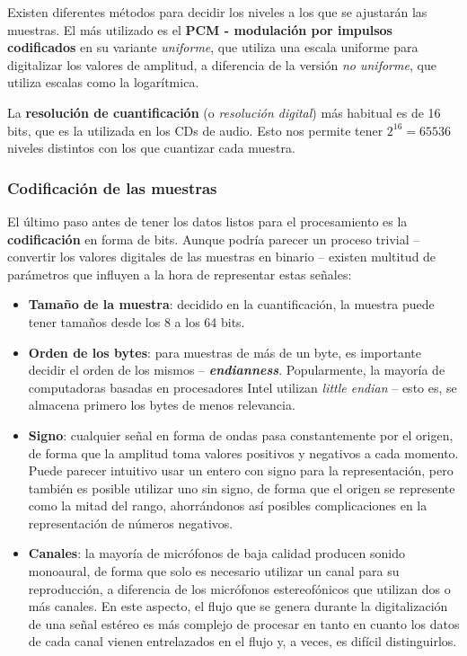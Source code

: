 Existen diferentes métodos para decidir los niveles a los que se ajustarán las
muestras. El más utilizado es el \textbf{PCM - modulación por impulsos
  codificados} en su variante \textit{uniforme}, que utiliza una escala uniforme
para digitalizar los valores de amplitud, a diferencia de la versión \textit{no
  uniforme}, que utiliza escalas como la logarítmica.

La \textbf{resolución de cuantificación} (o \textit{resolución digital}) más
habitual es de 16 bits, que es la utilizada en los CDs de audio. Esto nos
permite tener $2^{16} = 65536$ niveles distintos con los que cuantizar cada
muestra.

\subsubsection{Codificación de las muestras}

El último paso antes de tener los datos listos para el procesamiento es la
\textbf{codificación} en forma de bits. Aunque podría parecer un proceso trivial
-- convertir los valores digitales de las muestras en binario -- existen
multitud de parámetros que influyen a la hora de representar estas señales:
\begin{itemize}
\item \textbf{Tamaño de la muestra}: decidido en la cuantificación, la muestra
  puede tener tamaños desde los 8 a los 64 bits.
\item \textbf{Orden de los bytes}: para muestras de más de un byte, es
  importante decidir el orden de los mismos --
  \textbf{\textit{endianness}}. Popularmente, la mayoría de computadoras basadas
  en procesadores Intel utilizan \textit{little endian} -- esto es, se almacena
  primero los bytes de menos relevancia.
\item \textbf{Signo}: cualquier señal en forma de ondas pasa constantemente por
  el origen, de forma que la amplitud toma valores positivos y negativos a cada
  momento. Puede parecer intuitivo usar un entero con signo para la
  representación, pero también es posible utilizar uno sin signo, de forma que
  el origen se represente como la mitad del rango, ahorrándonos así posibles
  complicaciones en la representación de números negativos.
\item \textbf{Canales}: la mayoría de micrófonos de baja calidad producen sonido
  monoaural, de forma que solo es necesario utilizar un canal para su
  reproducción, a diferencia de los micrófonos estereofónicos que utilizan dos o
  más canales. En este aspecto, el flujo que se genera durante la digitalización
  de una señal estéreo es más complejo de procesar en tanto en cuanto los datos
  de cada canal vienen entrelazados en el flujo y, a veces, es difícil
  distinguirlos.
\end{itemize}

